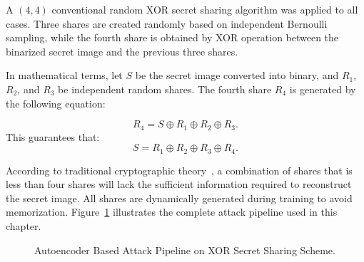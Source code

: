 A $(4,4)$ conventional random XOR secret sharing algorithm was applied to all cases.
Three shares are created randomly based on independent Bernoulli sampling,
while the fourth share is obtained by XOR operation between the binarized
secret image and the previous three shares.

In mathematical terms, let $S$ be the secret image converted into binary, and
$R_1$, $R_2$, and $R_3$ be independent random shares. The fourth share $R_4$ is
generated by the following equation:

\begin{equation}
R_4 = S \oplus R_1 \oplus R_2 \oplus R_3.
\end{equation}
This guarantees that:
\begin{equation}
S = R_1 \oplus R_2 \oplus R_3 \oplus R_4.
\end{equation}

According to traditional cryptographic theory~\cite{shannon1949communication},
a combination of shares that is less than four shares will lack the sufficient
information required to reconstruct the secret image. All shares are dynamically
generated during training to avoid memorization.
Figure~\ref{fig:xor_attack_pipeline} illustrates the complete attack pipeline used in this chapter.

\begin{figure}[htbp]
\centering
{}
\caption{Autoencoder Based Attack Pipeline on XOR Secret Sharing Scheme.}
\label{fig:xor_attack_pipeline}
\end{figure}

